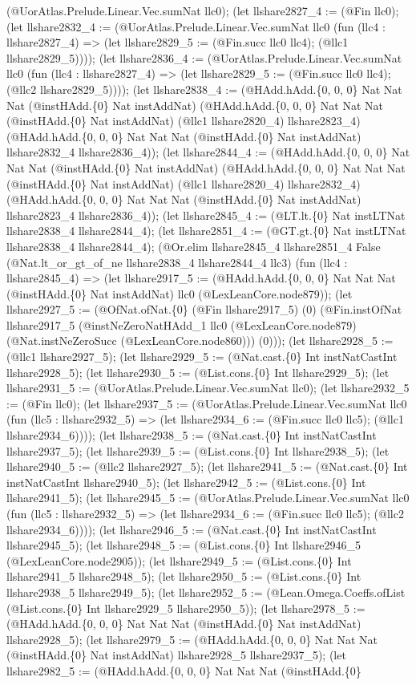 \documentclass[11pt]{article}
\begin{document}
(@UorAtlas.Prelude.Linear.Vec.sumNat llc0); (let llshare2827\_4 := (@Fin llc0); (let llshare2832\_4 := (@UorAtlas.Prelude.Linear.Vec.sumNat llc0 (fun (llc4 : llshare2827\_4) => (let llshare2829\_5 := (@Fin.succ llc0 llc4); (@llc1 llshare2829\_5)))); (let llshare2836\_4 := (@UorAtlas.Prelude.Linear.Vec.sumNat llc0 (fun (llc4 : llshare2827\_4) => (let llshare2829\_5 := (@Fin.succ llc0 llc4); (@llc2 llshare2829\_5)))); (let llshare2838\_4 := (@HAdd.hAdd.\{0, 0, 0\} Nat Nat Nat (@instHAdd.\{0\} Nat instAddNat) (@HAdd.hAdd.\{0, 0, 0\} Nat Nat Nat (@instHAdd.\{0\} Nat instAddNat) (@llc1 llshare2820\_4) llshare2823\_4) (@HAdd.hAdd.\{0, 0, 0\} Nat Nat Nat (@instHAdd.\{0\} Nat instAddNat) llshare2832\_4 llshare2836\_4)); (let llshare2844\_4 := (@HAdd.hAdd.\{0, 0, 0\} Nat Nat Nat (@instHAdd.\{0\} Nat instAddNat) (@HAdd.hAdd.\{0, 0, 0\} Nat Nat Nat (@instHAdd.\{0\} Nat instAddNat) (@llc1 llshare2820\_4) llshare2832\_4) (@HAdd.hAdd.\{0, 0, 0\} Nat Nat Nat (@instHAdd.\{0\} Nat instAddNat) llshare2823\_4 llshare2836\_4)); (let llshare2845\_4 := (@LT.lt.\{0\} Nat instLTNat llshare2838\_4 llshare2844\_4); (let llshare2851\_4 := (@GT.gt.\{0\} Nat instLTNat llshare2838\_4 llshare2844\_4); (@Or.elim llshare2845\_4 llshare2851\_4 False (@Nat.lt\_or\_gt\_of\_ne llshare2838\_4 llshare2844\_4 llc3) (fun (llc4 : llshare2845\_4) => (let llshare2917\_5 := (@HAdd.hAdd.\{0, 0, 0\} Nat Nat Nat (@instHAdd.\{0\} Nat instAddNat) llc0 (@LexLeanCore.node879)); (let llshare2927\_5 := (@OfNat.ofNat.\{0\} (@Fin llshare2917\_5) (0) (@Fin.instOfNat llshare2917\_5 (@instNeZeroNatHAdd\_1 llc0 (@LexLeanCore.node879) (@Nat.instNeZeroSucc (@LexLeanCore.node860))) (0))); (let llshare2928\_5 := (@llc1 llshare2927\_5); (let llshare2929\_5 := (@Nat.cast.\{0\} Int instNatCastInt llshare2928\_5); (let llshare2930\_5 := (@List.cons.\{0\} Int llshare2929\_5); (let llshare2931\_5 := (@UorAtlas.Prelude.Linear.Vec.sumNat llc0); (let llshare2932\_5 := (@Fin llc0); (let llshare2937\_5 := (@UorAtlas.Prelude.Linear.Vec.sumNat llc0 (fun (llc5 : llshare2932\_5) => (let llshare2934\_6 := (@Fin.succ llc0 llc5); (@llc1 llshare2934\_6)))); (let llshare2938\_5 := (@Nat.cast.\{0\} Int instNatCastInt llshare2937\_5); (let llshare2939\_5 := (@List.cons.\{0\} Int llshare2938\_5); (let llshare2940\_5 := (@llc2 llshare2927\_5); (let llshare2941\_5 := (@Nat.cast.\{0\} Int instNatCastInt llshare2940\_5); (let llshare2942\_5 := (@List.cons.\{0\} Int llshare2941\_5); (let llshare2945\_5 := (@UorAtlas.Prelude.Linear.Vec.sumNat llc0 (fun (llc5 : llshare2932\_5) => (let llshare2934\_6 := (@Fin.succ llc0 llc5); (@llc2 llshare2934\_6)))); (let llshare2946\_5 := (@Nat.cast.\{0\} Int instNatCastInt llshare2945\_5); (let llshare2948\_5 := (@List.cons.\{0\} Int llshare2946\_5 (@LexLeanCore.node2905)); (let llshare2949\_5 := (@List.cons.\{0\} Int llshare2941\_5 llshare2948\_5); (let llshare2950\_5 := (@List.cons.\{0\} Int llshare2938\_5 llshare2949\_5); (let llshare2952\_5 := (@Lean.Omega.Coeffs.ofList (@List.cons.\{0\} Int llshare2929\_5 llshare2950\_5)); (let llshare2978\_5 := (@HAdd.hAdd.\{0, 0, 0\} Nat Nat Nat (@instHAdd.\{0\} Nat instAddNat) llshare2928\_5); (let llshare2979\_5 := (@HAdd.hAdd.\{0, 0, 0\} Nat Nat Nat (@instHAdd.\{0\} Nat instAddNat) llshare2928\_5 llshare2937\_5); (let llshare2982\_5 := (@HAdd.hAdd.\{0, 0, 0\} Nat Nat Nat (@instHAdd.\{0\} 
\end{document}
